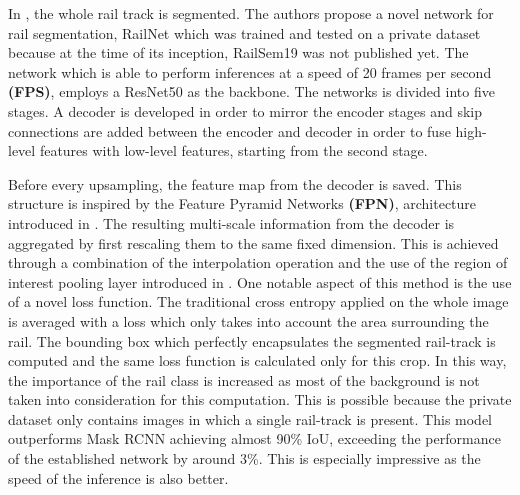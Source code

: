 \documentclass[conference]{IEEEtran}
\begin{document}
In \cite{wang2019railnet}, the whole rail track is segmented. The authors propose a novel network for rail segmentation, RailNet which was trained and tested on a private dataset because at the time of its inception, RailSem19 was not published yet. The network which is able to perform inferences at a speed of 20 frames per second \textbf{(FPS)}, employs a ResNet50 as the backbone. The networks is divided into five stages. A decoder is developed in order to mirror the encoder stages and skip connections are added between the encoder and decoder in order to fuse high-level features with low-level features, starting from the second stage.

Before every upsampling, the feature map from the decoder is saved. This structure is inspired by the Feature Pyramid Networks \textbf{(FPN)}, architecture introduced in \cite{lin2017feature}. The resulting multi-scale information from the decoder is aggregated by first rescaling them to the same fixed dimension. This is achieved through a combination of the interpolation operation and the use of the region of interest pooling layer introduced in \cite{girshick2015fast}. One notable aspect of this method is the use of a novel loss function. The traditional cross entropy applied on the whole image is averaged with a loss which only takes into account the area surrounding the rail. The bounding box which perfectly encapsulates the segmented rail-track is computed and the same loss function is calculated only for this crop. In this way, the importance of the rail class is increased as most of the background is not taken into consideration for this computation. This is possible because the private dataset only contains images in which a single rail-track is present. This model outperforms Mask RCNN achieving almost 90\% IoU, exceeding the performance of the established network by around 3\%. This is especially impressive as the speed of the inference is also better.
\end{document}
